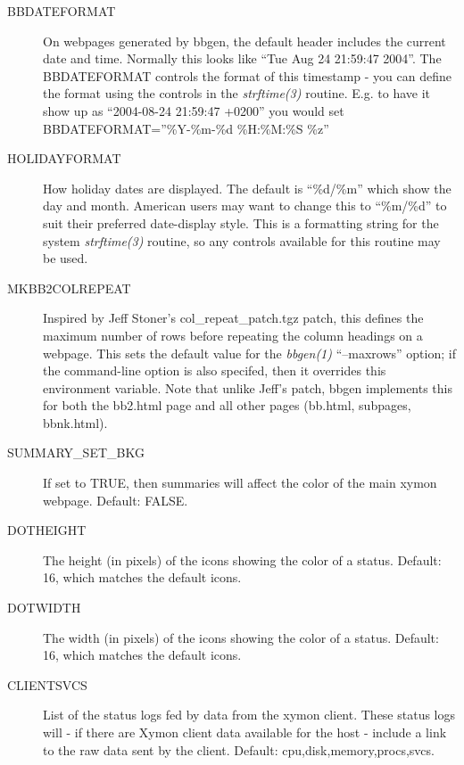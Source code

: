 \begin{description}
 

\item[BBDATEFORMAT] On webpages generated by bbgen, the default header includes the current date and time. Normally this looks like ``Tue Aug 24 21:59:47 2004''. The BBDATEFORMAT controls the format of this timestamp - you can define the format using the controls in the \emph{strftime(3)}
 routine. E.g. to have it show up as ``2004-08-24 21:59:47 +0200'' you would set BBDATEFORMAT=''\%Y-\%m-\%d \%H:\%M:\%S \%z'' 

 

\item[HOLIDAYFORMAT] How holiday dates are displayed. The default is ``\%d/\%m'' which show the day and month. American users may want to change this to ``\%m/\%d'' to suit their preferred date-display style. This is a formatting string for the system \emph{strftime(3)}
 routine, so any controls available for this routine may be used. 

 

\item[MKBB2COLREPEAT] Inspired by Jeff Stoner's col\_repeat\_patch.tgz patch, this defines the maximum number of rows before repeating the column headings on a webpage. This sets the default value for the \emph{bbgen(1)}
 ``--maxrows'' option; if the command-line option is also specifed, then it overrides this environment variable. Note that unlike Jeff's patch, bbgen implements this for both the bb2.html page and all other pages (bb.html, subpages, bbnk.html). 

 

\item[SUMMARY\_SET\_BKG] If set to TRUE, then summaries will affect the color of the main xymon webpage. Default: FALSE. 

 

\item[DOTHEIGHT] The height (in pixels) of the icons showing the color of a status. Default: 16, which matches the default icons. 

 

\item[DOTWIDTH] The width (in pixels) of the icons showing the color of a status. Default: 16, which matches the default icons. 

 

\item[CLIENTSVCS] List of the status logs fed by data from the xymon client. These status logs will - if there are Xymon client data available for the host - include a link to the raw data sent by the client. Default: cpu,disk,memory,procs,svcs. 


\end{description}
